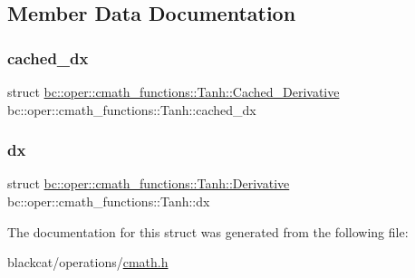 \subsection{Member Data Documentation}
\mbox{\label{structbc_1_1oper_1_1cmath__functions_1_1Tanh_af307ef995dbbe18f2d3cc0d310ae1898}} 
\subsubsection{\texorpdfstring{cached\+\_\+dx}{cached\_dx}}
{\footnotesize\ttfamily struct \hyperlink{structbc_1_1oper_1_1cmath__functions_1_1Tanh_1_1Cached__Derivative}{bc\+::oper\+::cmath\+\_\+functions\+::\+Tanh\+::\+Cached\+\_\+\+Derivative}   bc\+::oper\+::cmath\+\_\+functions\+::\+Tanh\+::cached\+\_\+dx}

\mbox{\label{structbc_1_1oper_1_1cmath__functions_1_1Tanh_a640cb2101c0a4f59d456b68498224db8}} 
\subsubsection{\texorpdfstring{dx}{dx}}
{\footnotesize\ttfamily struct \hyperlink{structbc_1_1oper_1_1cmath__functions_1_1Tanh_1_1Derivative}{bc\+::oper\+::cmath\+\_\+functions\+::\+Tanh\+::\+Derivative}   bc\+::oper\+::cmath\+\_\+functions\+::\+Tanh\+::dx}



The documentation for this struct was generated from the following file\+:\begin{DoxyCompactItemize}
\item 
blackcat/operations/\hyperlink{cmath_8h}{cmath.\+h}\end{DoxyCompactItemize}
